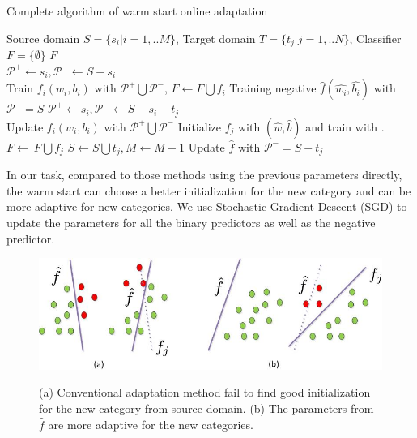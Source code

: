 \begin{algorithm}
  \caption{Complete algorithm of warm start online adaptation}\label{algo:ws}
  \begin{algorithmic}[1]
    \REQUIRE Source domain $S = \{ {s_i}|i = 1,..M\} $, Target domain $T = \{ {t_j}|j = 1,..N\} $, Classifier $F = \{\emptyset\}$
    \ENSURE $F$\\
         \STATE $\mathcal{P^+}\leftarrow s_i, \mathcal{P^-}\leftarrow S-s_i$\\
          Train ${{f_i}\left( {{w_i},{b_i}} \right)}$ with $\mathcal{P^+}\bigcup\mathcal{P^-}$, $F\leftarrow F\bigcup f_i$
    \ENDFOR
    \STATE Training negative $\hat{f}\left( {\hat{w_i},\hat{b_i}} \right)$ with $\mathcal{P^-}=S$
             \STATE $\mathcal{P^+}\leftarrow s_i, \mathcal{P^-}\leftarrow S-s_i+t_j$ \\
              Update ${{f_i}\left( {{w_i},{b_i}} \right)}$ with $\mathcal{P^+}\bigcup\mathcal{P^-}$
        \ENDFOR
        \STATE Initialize $f_j$ with $(\hat{w},\hat{b})$ and train with .
        \STATE $F\leftarrow\ F\bigcup f_j$
        \STATE $S\leftarrow S\bigcup t_j, M\leftarrow M+1$
        \STATE Update $\hat{f}$ with $\mathcal{P^-}=S+t_j$
     \ENDWHILE
  \end{algorithmic}
\end{algorithm}

In our task, compared to those methods using the previous parameters directly, the warm start can choose a better initialization for the new category and can be more adaptive for new categories. We use Stochastic Gradient Descent (SGD) to update the parameters for all the binary predictors as well as the negative predictor. 

\begin{figure}
  \centering
  \includegraphics[scale = .6]{fig/domain.jpg}\\
  \caption{(a) Conventional adaptation method fail to find good initialization for the new category from source domain. (b) The parameters from $\hat{f}$ are more adaptive for the new categories.}
  \label{fig:wm}
\end{figure}

